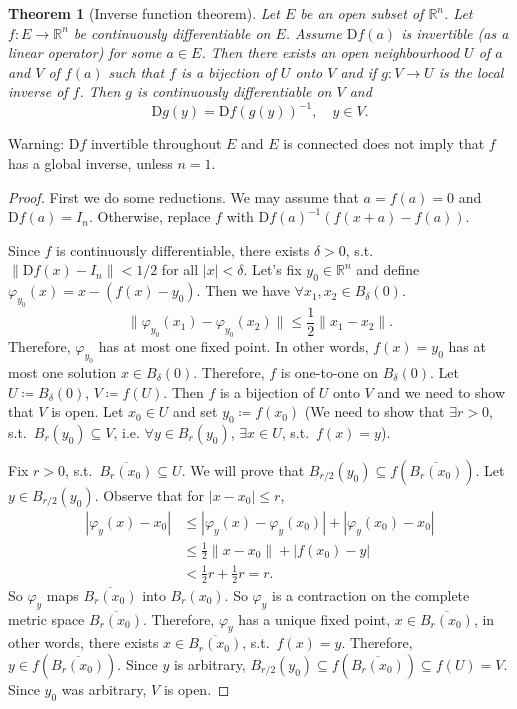 \documentclass[12pt]{article}
\theoremstyle{plain}
\newtheorem{thm}{Theorem}
\theoremstyle{definition}
\begin{document}
\begin{thm}[Inverse function theorem]
    Let $E$ be an open subset of $\mathbb{R}^n$.
    Let $f: E\rightarrow\mathbb{R}^n$ be continuously differentiable on $E$.
    Assume $\mathrm{D}f(a)$ is invertible (as a linear operator) for some $a\in E$.
    Then there exists an open neighbourhood $U$ of $a$ and $V$ of $f(a)$ such that $f$ is a bijection of $U$ onto $V$ and if $g:V\rightarrow U$ is the
    local inverse of $f$.
    Then $g$ is continuously differentiable on $V$ and 
    \[
        \mathrm{D}g(y) = \mathrm{D}f(g(y))^{-1},\quad y\in V.
    \]
\end{thm}
Warning:
$\mathrm{D}f$ invertible throughout $E$ and $E$ is connected does not imply that $f$ has a global inverse, unless $n=1$.
\begin{proof}
    First we do some reductions.
    We may assume that $a=f(a) = 0$ and $\mathrm{D}f(a) = I_n$.
    Otherwise, replace $f$ with $\mathrm{D}f(a)^{-1}(f(x+a) - f(a))$.

    Since $f$ is continuously differentiable, there exists $\delta > 0$, s.t.\ $\|\mathrm{D}f(x) - I_n\| < 1/2$ for all $|x|<\delta$.
    Let's fix $y_0\in\mathbb{R}^n$ and define $\varphi_{y_0}(x) = x-(f(x) - y_0)$.
    Then we have $\forall x_1, x_2\in B_{\delta}(0)$.
    \[
        \|\varphi_{y_0}(x_1) - \varphi_{y_0}(x_2)\| \leq \frac{1}{2}\|x_1-x_2\|.
    \]
    Therefore,
    $\varphi_{y_0}$ has at most one fixed point.
    In other words,
    $f(x) = y_0$ has at most one solution $x\in B_\delta(0)$.
    Therefore, $f$ is one-to-one on $B_\delta(0)$.
    Let $U\coloneqq B_\delta(0)$, $V\coloneqq f(U)$.
    Then $f$ is a bijection of $U$ onto $V$ and we need to show that $V$ is open.
    Let $x_0\in U$ and set $y_0 \coloneqq f(x_0)$
    (We need to show that $\exists r > 0$, s.t.\ $B_r(y_0)\subseteq V$, i.e. $\forall y\in B_r(y_0)$, $\exists x\in U$, s.t.\ $f(x) = y$).

    Fix $r>0$, s.t.\ $\overline{B_r(x_0)} \subseteq U$.
    We will prove that $B_{r/2}(y_0)\subseteq f(\overline{B_r(x_0)})$.
    Let $y\in B_{r/2}(y_0)$.
    Observe that for $|x-x_0|\leq r$,
    \[\begin{aligned}
            |\varphi_y(x)-x_0| &\leq |\varphi_y(x) - \varphi_y(x_0)| + |\varphi_y(x_0) - x_0|\\
                               &\leq \frac{1}{2}\|x-x_0\|+|f(x_0) - y|\\
                               &<\frac{1}{2}r + \frac{1}{2}r = r.
    \end{aligned}\]
    So $\varphi_y$ maps $\overline{B_r(x_0)}$ into $B_r(x_0)$.
    So $\varphi_y$ is a contraction on the complete metric space $\overline{B_r(x_0)}$.
    Therefore, $\varphi_y$ has a unique fixed point, $x\in \overline{B_r(x_0)}$, in other words, there exists $x\in\overline{B_r(x_0)}$, s.t.\ $f(x) =
    y$.
    Therefore, $y\in f(\overline{B_r(x_0)})$.
    Since $y$ is arbitrary, $B_{r/2}(y_0) \subseteq f(\overline{B_r(x_0)}) \subseteq f(U) = V$.
    Since $y_0$ was arbitrary, $V$ is open.


\end{proof}
\end{document}
